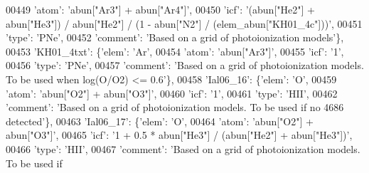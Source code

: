 \begin{DoxyCode}
00449                                      \textcolor{stringliteral}{'atom'}: \textcolor{stringliteral}{'abun["Ar3"] + abun["Ar4"]'},
00450                                      \textcolor{stringliteral}{'icf'}: \textcolor{stringliteral}{'(abun["He2"] + abun["He3"]) / abun["He2"] / (1 -  abun["N2"] /
       (elem\_abun["KH01\_4c"]))'},
00451                                      \textcolor{stringliteral}{'type'}: \textcolor{stringliteral}{'PNe'},
00452                                      \textcolor{stringliteral}{'comment'}: \textcolor{stringliteral}{'Based on a grid of photoionization models'}\},
00453                          \textcolor{stringliteral}{'KH01\_4txt'}: \{\textcolor{stringliteral}{'elem'}: \textcolor{stringliteral}{'Ar'},
00454                                      \textcolor{stringliteral}{'atom'}: \textcolor{stringliteral}{'abun["Ar3"]'},
00455                                      \textcolor{stringliteral}{'icf'}: \textcolor{stringliteral}{'1'},
00456                                      \textcolor{stringliteral}{'type'}: \textcolor{stringliteral}{'PNe'},
00457                                      \textcolor{stringliteral}{'comment'}: \textcolor{stringliteral}{'Based on a grid of photoionization models. To be used when
       log(O/O2) <= 0.6'}\},
00458                          \textcolor{stringliteral}{'Ial06\_16'}: \{\textcolor{stringliteral}{'elem'}: \textcolor{stringliteral}{'O'},
00459                                       \textcolor{stringliteral}{'atom'}: \textcolor{stringliteral}{'abun["O2"] + abun["O3"]'},
00460                                       \textcolor{stringliteral}{'icf'}: \textcolor{stringliteral}{'1'},
00461                                       \textcolor{stringliteral}{'type'}: \textcolor{stringliteral}{'HII'},
00462                                       \textcolor{stringliteral}{'comment'}: \textcolor{stringliteral}{'Based on a grid of photoionization models. To be used if
       no 4686 detected'}\},
00463                          \textcolor{stringliteral}{'Ial06\_17'}: \{\textcolor{stringliteral}{'elem'}: \textcolor{stringliteral}{'O'},
00464                                       \textcolor{stringliteral}{'atom'}: \textcolor{stringliteral}{'abun["O2"] + abun["O3"]'},
00465                                       \textcolor{stringliteral}{'icf'}: \textcolor{stringliteral}{'1 + 0.5 * abun["He3"] / (abun["He2"] + abun["He3"])'},
00466                                       \textcolor{stringliteral}{'type'}: \textcolor{stringliteral}{'HII'},
00467                                       \textcolor{stringliteral}{'comment'}: \textcolor{stringliteral}{'Based on a grid of photoionization models. To be used if
}
\end{DoxyCode}
